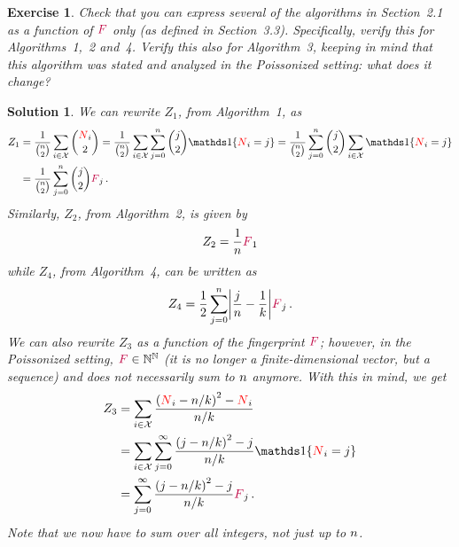\documentclass[biber,plain]{nowfnt} %
\newtheorem{question}{Exercise}[chapter]
\newtheorem{solution}{Solution}[chapter]
\newcommand{\occur}{\textcolor{red}{N}}
\newcommand{\freq}{\textcolor{purple}{F}}
\newcommand{\occur}{N}
\newcommand{\freq}{F}
\begin{document}
\begin{question}\label{exo:reexpress:algos:frequency:only}
Check that you can express several of the algorithms in Section~2.1 as a function of $\freq$ only (as defined in Section~3.3). Specifically, verify this for Algorithms~1,~2 and~4. Verify this also for Algorithm~3, keeping in mind that this algorithm was stated and analyzed in the Poissonized setting: what does it change?
\end{question}
\begin{solution}
We can rewrite $Z_1$, from Algorithm~1, as
\begin{align*}
	Z_1  &= \frac{1}{\binom{\ns}{2}} \sum_{i\in\domain} \binom{\occur_i}{2} 
		= \frac{1}{\binom{\ns}{2}} \sum_{i\in\domain} \sum_{j=0}^{\ns} \binom{j}{2} \indic{\occur_i=j}
		= \frac{1}{\binom{\ns}{2}} \sum_{j=0}^{\ns} \binom{j}{2} \sum_{i\in\domain}\indic{\occur_i=j} \\
		&= \frac{1}{\binom{\ns}{2}} \sum_{j=0}^{\ns} \binom{j}{2} \freq_j\,.
\end{align*}
Similarly, $Z_2$, from Algorithm~2, is given by
\[
	Z_2 = \frac{1}{\ns} \freq_1
\]
while $Z_4$, from Algorithm~4, can be written as
\[
	Z_4 = \frac{1}{2}\sum_{j=0}^{\ns} \abs{\frac{j}{\ns}-\frac{1}{\ab}} \freq_j\,.
\]
We can also rewrite $Z_3$ as a function of the fingerprint $\freq$; however, in the Poissonized setting, $\freq\in \N^{\N}$ (it is no longer a finite-dimensional vector, but a sequence) and does not necessarily sum to $n$ anymore. With this in mind, we get
\begin{align*}
	Z_3 
	&= \sum_{i\in\domain} \frac{\Paren{\occur_i-\ns/\ab}^2-\occur_i}{\ns/\ab} \\
	&= \sum_{i\in\domain} \sum_{j=0}^{\infty} \frac{\Paren{j-\ns/\ab}^2-j}{\ns/\ab} \indic{\occur_i=j} \\
	&= \sum_{j=0}^{\infty} \frac{\Paren{j-\ns/\ab}^2-j}{\ns/\ab} \freq_j\,.
\end{align*}
Note that we now have to sum over all integers, not just up to $n$.
\end{solution}
\end{document}
